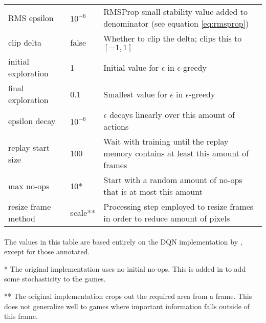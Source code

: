 \begin{table}[]
\begin{tabularx}{1.1\linewidth}{ll X}
RMS epsilon                     & $10^{-6}$         & RMSProp small stability value added to denominator (see equation \ref{eq:rmsprop})                              \\
clip delta                      & false             & Whether to clip the delta; \cite{Mnih2015} clips this to $[-1, 1]$                                      \\
initial exploration             & 1                 & Initial value for $\epsilon$ in $\epsilon$-greedy                                                        \\
final exploration               & 0.1               & Smallest value for $\epsilon$ in $\epsilon$-greedy                                                       \\
epsilon decay                   & $10^{-6}$         & $\epsilon$ decays linearly over this amount of actions                                                   \\
replay start size               & 100               & Wait with training until the replay memory contains at least this amount of frames                       \\
max no-ops                      & 10*              & Start with a random amount of no-ops that is at most this amount                                         \\
resize frame method             & scale**          & Processing step employed to resize frames in order to reduce amount of pixels                            \\
\end{tabularx}
\paragraph{}
  The values in this table are based entirely on the DQN implementation by
  \cite{Mnih2013},
  except for those annotated.

  * The original implementation uses no initial no-ops.
  This is added in to add some stochasticity to the games.

  ** The original implementation crops out the required area from a frame.
  This does not generalize well to games where important information
  falls outside of this frame.
\end{table}

